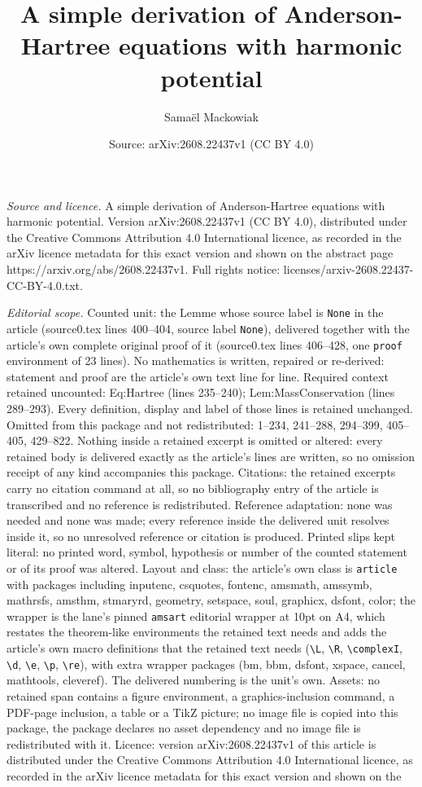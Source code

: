 \documentclass[10pt,a4paper]{amsart}
\title[A simple derivation of Anderson-Hartree equations with harmo]{A simple derivation of Anderson-Hartree equations with harmonic potential}
\author{Sama\"el Mackowiak}
\date{Source: arXiv:2608.22437v1 (CC BY 4.0)}
\begin{document}
\maketitle

\noindent\emph{Source and licence.} A simple derivation of Anderson-Hartree equations with harmonic potential. Version arXiv:2608.22437v1 (CC BY 4.0), distributed under the Creative Commons Attribution 4.0 International licence, as recorded in the arXiv licence metadata for this exact version and shown on the abstract page https://arxiv.org/abs/2608.22437v1. Full rights notice: licenses/arxiv-2608.22437-CC-BY-4.0.txt.\par\smallskip

\noindent\textit{Editorial scope.} Counted unit: the Lemme whose source label is \texttt{None} in the article (source0.tex lines 400--404, source label \texttt{None}), delivered together with the article's own complete original proof of it (source0.tex lines 406--428, one \texttt{proof} environment of 23 lines). No mathematics is written, repaired or re-derived: statement and proof are the article's own text line for line. Required context retained uncounted: Eq:Hartree (lines 235--240); Lem:MassConservation (lines 289--293). Every definition, display and label of those lines is retained unchanged. Omitted from this package and not redistributed: 1--234, 241--288, 294--399, 405--405, 429--822. Nothing inside a retained excerpt is omitted or altered: every retained body is delivered exactly as the article's lines are written, so no omission receipt of any kind accompanies this package. Citations: the retained excerpts carry no citation command at all, so no bibliography entry of the article is transcribed and no reference is redistributed. Reference adaptation: none was needed and none was made; every reference inside the delivered unit resolves inside it, so no unresolved reference or citation is produced. Printed slips kept literal: no printed word, symbol, hypothesis or number of the counted statement or of its proof was altered. Layout and class: the article's own class is \texttt{article} with packages including inputenc, csquotes, fontenc, amsmath, amssymb, mathrsfs, amsthm, stmaryrd, geometry, setspace, soul, graphicx, dsfont, color; the wrapper is the lane's pinned \texttt{amsart} editorial wrapper at 10pt on A4, which restates the theorem-like environments the retained text needs and adds the article's own macro definitions that the retained text needs (\texttt{\textbackslash L}, \texttt{\textbackslash R}, \texttt{\textbackslash complexI}, \texttt{\textbackslash d}, \texttt{\textbackslash e}, \texttt{\textbackslash p}, \texttt{\textbackslash re}), with extra wrapper packages (bm, bbm, dsfont, xspace, cancel, mathtools, cleveref). The delivered numbering is the unit's own. Assets: no retained span contains a figure environment, a graphics-inclusion command, a PDF-page inclusion, a table or a TikZ picture; no image file is copied into this package, the package declares no asset dependency and no image file is redistributed with it. Licence: version arXiv:2608.22437v1 of this article is distributed under the Creative Commons Attribution 4.0 International licence, as recorded in the arXiv licence metadata for this exact version and shown on the 
\end{document}

